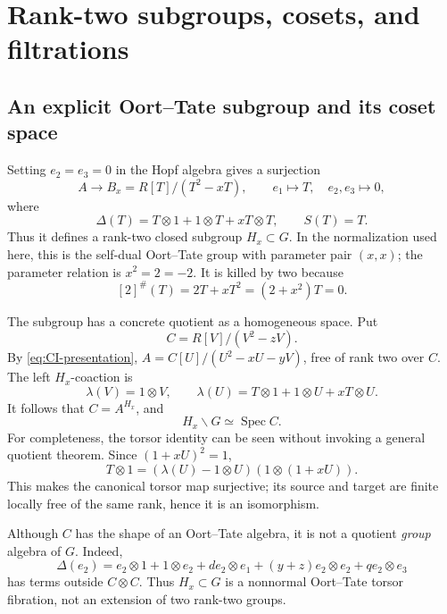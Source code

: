 \documentclass[11pt]{article}
\theoremstyle{remark}
\newcommand{\Spec}{\operatorname{Spec}}
\begin{document}
\section{Rank-two subgroups, cosets, and filtrations}
\label{sec:subgroups}

\subsection{An explicit Oort--Tate subgroup and its coset space}

Setting \(e_2=e_3=0\) in the Hopf algebra gives a surjection
\begin{equation}\label{eq:basic-H-quotient}
 A\longrightarrow B_x=R[T]/(T^2-xT),\qquad
 e_1\mapsto T,\quad e_2,e_3\mapsto0,
\end{equation}
where
\begin{equation}\label{eq:basic-H-Hopf}
 \Delta(T)=T\otimes1+1\otimes T+xT\otimes T,
 \qquad S(T)=T.
\end{equation}
Thus it defines a rank-two closed subgroup \(H_x\subset G\).  In the
normalization used here, this is the self-dual Oort--Tate group with
parameter pair \((x,x)\); the parameter relation is \(x^2=2=-2\).  It is
killed by two because
\begin{equation}\label{eq:H-killed-two}
 [2]^\#(T)=2T+xT^2=(2+x^2)T=0.
\end{equation}

The subgroup has a concrete quotient as a homogeneous space.  Put
\begin{equation}\label{eq:left-coset-algebra}
 C=R[V]/(V^2-zV).
\end{equation}
By \eqref{eq:CI-presentation}, \(A=C[U]/(U^2-xU-yV)\), free of rank two
over \(C\).  The left \(H_x\)-coaction is
\begin{equation}\label{eq:left-H-coaction}
 \lambda(V)=1\otimes V,\qquad
 \lambda(U)=T\otimes1+1\otimes U+xT\otimes U.
\end{equation}
It follows that \(C=A^{H_x}\), and
\begin{equation}\label{eq:left-coset}
 H_x\backslash G\simeq\Spec C.
\end{equation}
For completeness, the torsor identity can be seen without invoking a
general quotient theorem.  Since \((1+xU)^2=1\),
\[
 T\otimes1=(\lambda(U)-1\otimes U)(1\otimes(1+xU)).
\]
This makes the canonical torsor map surjective; its source and target are
finite locally free of the same rank, hence it is an isomorphism.

Although \(C\) has the shape of an Oort--Tate algebra, it is not a quotient
\emph{group} algebra of \(G\).  Indeed,
\begin{equation}\label{eq:e2-external-terms}
 \Delta(e_2)=e_2\otimes1+1\otimes e_2
 +d e_2\otimes e_1+(y+z)e_2\otimes e_2+q e_2\otimes e_3
\end{equation}
has terms outside \(C\otimes C\).  Thus \(H_x\subset G\) is a
nonnormal Oort--Tate torsor fibration, not an extension of two rank-two
groups.
\end{document}

